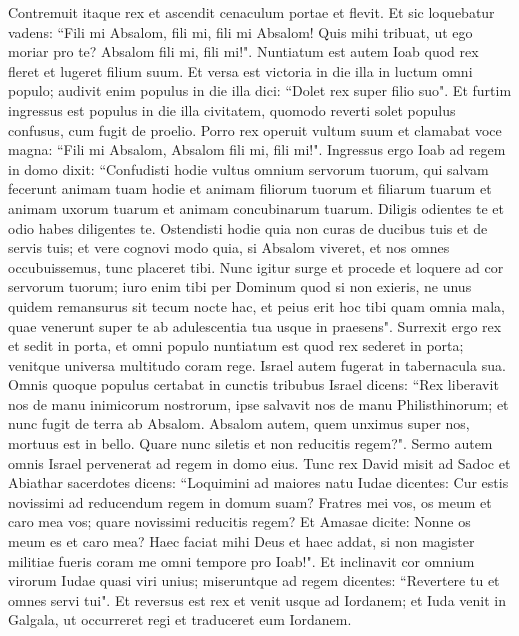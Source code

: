 \begin{biblechapter}  
\verse Contremuit itaque rex et ascendit cenaculum portae et flevit. Et sic loquebatur vadens: “Fili mi Absalom, fili mi, fili mi Absalom! Quis mihi tribuat, ut ego moriar pro te? Absalom fili mi, fili mi!". 
\verse Nuntiatum est autem Ioab quod rex fleret et lugeret filium suum. 
\verse Et versa est victoria in die illa in luctum omni populo; audivit enim populus in die illa dici: “Dolet rex super filio suo". 
\verse Et furtim ingressus est populus in die illa civitatem, quomodo reverti solet populus confusus, cum fugit de proelio. 
\verse Porro rex operuit vultum suum et clamabat voce magna: “Fili mi Absalom, Absalom fili mi, fili mi!". 
\verse Ingressus ergo Ioab ad regem in domo dixit: “Confudisti hodie vultus omnium servorum tuorum, qui salvam fecerunt animam tuam hodie et animam filiorum tuorum et filiarum tuarum et animam uxorum tuarum et animam concubinarum tuarum. 
\verse Diligis odientes te et odio habes diligentes te. Ostendisti hodie quia non curas de ducibus tuis et de servis tuis; et vere cognovi modo quia, si Absalom viveret, et nos omnes occubuissemus, tunc placeret tibi. 
\verse Nunc igitur surge et procede et loquere ad cor servorum tuorum; iuro enim tibi per Dominum quod si non exieris, ne unus quidem remansurus sit tecum nocte hac, et peius erit hoc tibi quam omnia mala, quae venerunt super te ab adulescentia tua usque in praesens". 
\verse Surrexit ergo rex et sedit in porta, et omni populo nuntiatum est quod rex sederet in porta; venitque universa multitudo coram rege. Israel autem fugerat in tabernacula sua. 
\verse Omnis quoque populus certabat in cunctis tribubus Israel dicens: “Rex liberavit nos de manu inimicorum nostrorum, ipse salvavit nos de manu Philisthinorum; et nunc fugit de terra ab Absalom. 
\verse Absalom autem, quem unximus super nos, mortuus est in bello. Quare nunc siletis et non reducitis regem?". 
\verse Sermo autem omnis Israel pervenerat ad regem in domo eius. Tunc rex David misit ad Sadoc et Abiathar sacerdotes dicens: “Loquimini ad maiores natu Iudae dicentes: Cur estis novissimi ad reducendum regem in domum suam? 
\verse Fratres mei vos, os meum et caro mea vos; quare novissimi reducitis regem? 
\verse Et Amasae dicite: Nonne os meum es et caro mea? Haec faciat mihi Deus et haec addat, si non magister militiae fueris coram me omni tempore pro Ioab!". 
\verse Et inclinavit cor omnium virorum Iudae quasi viri unius; miseruntque ad regem dicentes: “Revertere tu et omnes servi tui". 
\verse Et reversus est rex et venit usque ad Iordanem; et Iuda venit in Galgala, ut occurreret regi et traduceret eum Iordanem. 

\end{biblechapter}
